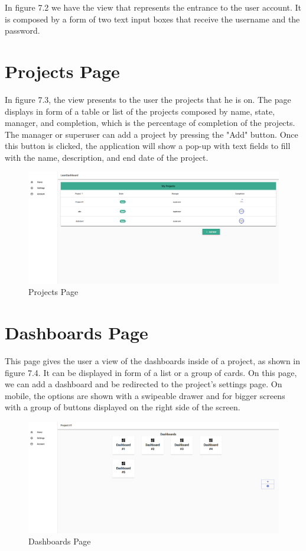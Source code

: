 \documentclass[a4paper,twoside,10pt]{report}
\begin{document}
\newpage 

In figure 7.2 we have the view that represents the entrance to the user account. It is composed by a form of two text input boxes that receive the username and the password.

\section{Projects Page}
In figure 7.3, the view presents to the user the projects that he is on. The page displays in form of a table or list of the projects composed by name, state, manager, and completion, which is the percentage of completion of the projects. The manager or superuser can add a project by pressing the "Add" button. Once this button is clicked, the application will show a pop-up with text fields to fill with the name, description, and end date of the project.

\begin{figure}[h!]
\center
  \includegraphics[width=\textwidth]{projectsPage.png}
\caption{Projects Page}
\end{figure}

\section{Dashboards Page}
This page gives the user a view of the dashboards inside of a project, as shown in figure 7.4. It can be displayed in form of a list or a group of cards. On this page, we can add a dashboard and be redirected to the project's settings page. On mobile, the options are shown with a swipeable drawer and for bigger screens with a group of buttons displayed on the right side of the screen.

\begin{figure}[h!]
\center
  \includegraphics[width=\textwidth]{dashboardsPage.png}
\caption{Dashboards Page}
\end{figure}
\end{document}
